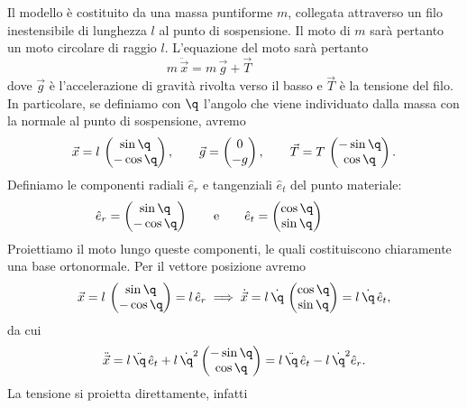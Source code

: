 Il modello è costituito da una massa puntiforme \(m\), collegata attraverso un filo inestensibile di lunghezza \(l\) al punto di sospensione.
Il moto di \(m\) sarà pertanto un moto circolare di raggio \(l\). L'equazione del moto sarà pertanto
\[
	m\,\ddot{\vec{x}} = m\,\vec{g} + \vec{T} \qquad\qquad 
\]
dove \(\vec{g}\) è l'accelerazione di gravità rivolta verso il basso e \(\vec{T}\) è la tensione del filo. In particolare, se definiamo con \(\q\) l'angolo che viene individuato dalla massa con la normale al punto di sospensione, avremo
\[
	\vec{x} = l\,\begin{pmatrix}\sin \q\\-\cos\q\end{pmatrix}, \qquad \vec{g} = \begin{pmatrix}0\\-g\end{pmatrix}, \qquad \vec{T} = T\,\begin{pmatrix}-\sin\q\\\cos \q\end{pmatrix}.
\]
Definiamo le componenti radiali \(\hat{e}_r\) e tangenziali \(\hat{e}_t\) del punto materiale:
\[
	\hat{e}_r = \begin{pmatrix}\sin\q\\-\cos\q\end{pmatrix} \qquad\text{e}\qquad \hat{e}_t = \begin{pmatrix}\cos\q\\\sin\q\end{pmatrix} \qquad \qquad 
\]
Proiettiamo il moto lungo queste componenti, le quali costituiscono chiaramente una base ortonormale. Per il vettore posizione avremo
\[
	\vec{x} = l\,	\begin{pmatrix}
		\sin\q \\
		-\cos \q	
	\end{pmatrix}
	= l\,\hat{e}_r \implies
	\dot{\vec{x}} = l\,\dot{\q}\, 	\begin{pmatrix}
		\cos\q \\
		\sin\q
	\end{pmatrix}
	= l\,\dot{\q}\,\hat{e}_t,										
\]
da cui
\[
	\ddot{\vec{x}} = l\,\ddot{\q}\,\hat{e}_t + l\,\dot{\q}^2 	\begin{pmatrix}
		-\sin\q \\
		\cos\q
	\end{pmatrix}
	= l\,\ddot{\q}\,\hat{e}_t - l\,\dot{\q}^2 \hat{e}_r.												
\]
La tensione si proietta direttamente, infatti
